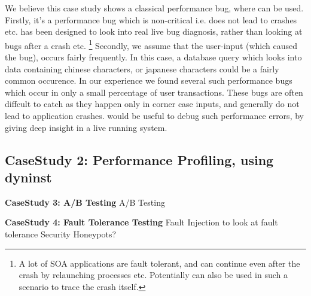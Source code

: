 We believe this case study shows a classical performance bug, where \parikshan can be used.
Firstly, it's a performance bug which is non-critical i.e. does not lead to crashes etc.
\parikshan has been designed to look into real live bug diagnosis, rather than looking at bugs after a crash etc.
\footnote{A lot of SOA applications are fault tolerant, and can continue even after the crash by relaunching processes etc. Potentially \parikshan can also be used in such a scenario to trace the crash itself.}
Secondly, we assume that the user-input (which caused the bug), occurs fairly frequently.
In this case, a database query which looks into data containing chinese characters, or japanese characters could be a fairly common occurence.
In our experience we found several such performance bugs which occur in only a small percentage of user transactions.
These bugs are often diffcult to catch as they happen only in corner case inputs, and generally do not lead to application crashes.
\parikshan would be useful to debug such performance errors, by giving deep insight in a live running system.

\subsection {CaseStudy 2: Performance Profiling, using dyninst}

\par \noindent \textbf{CaseStudy 3: A/B Testing}
A/B Testing 

\par \noindent \textbf{CaseStudy 4: Fault Tolerance Testing}
Fault Injection to look at fault tolerance
Security Honeypots? 

